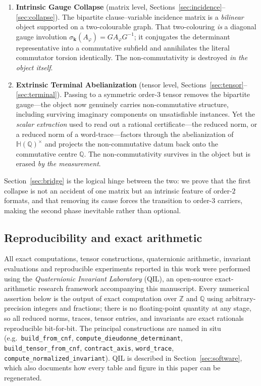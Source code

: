 \documentclass[pdflatex,sn-mathphys-num]{sn-jnl}
\theoremstyle{thmstyleone}%
\theoremstyle{thmstyletwo}%
\theoremstyle{thmstylethree}%
\newcommand{\HH}{\mathbb{H}}
\newcommand{\QQ}{\mathbb{Q}}
\newcommand{\ZZ}{\mathbb{Z}}
\newcommand{\bk}{\mathbf{k}}
\newcommand{\Aphi}{A_{\varphi}}
\begin{document}
\begin{enumerate}
\item \textbf{Intrinsic Gauge Collapse} (matrix level,
Sections~\ref{sec:incidence}--\ref{sec:collapse}). The bipartite
clause--variable incidence matrix is a \emph{bilinear} object supported on
a two-colourable graph. That two-colouring \emph{is} a diagonal gauge
involution $\sigma_{\bk}(\Aphi)=G\Aphi G^{-1}$; it conjugates the
determinant representative into a commutative subfield and annihilates the
literal commutator torsion identically. The non-commutativity is destroyed
\emph{in the object itself}.

\item \textbf{Extrinsic Terminal Abelianization} (tensor level,
Sections~\ref{sec:tensor}--\ref{sec:terminal}). Passing to a symmetric
order-$3$ tensor removes the bipartite gauge---the object now genuinely
carries non-commutative structure, including surviving imaginary
components on unsatisfiable instances. Yet the \emph{scalar extraction}
used to read out a rational certificate---the reduced norm, or a reduced
norm of a word-trace---factors through the abelianization of
$\HH(\QQ)^{\times}$ and projects the non-commutative datum back onto the
commutative centre $\QQ$. The non-commutativity survives in the object but
is erased \emph{by the measurement}.
\end{enumerate}

Section~\ref{sec:bridge} is the logical hinge between the two: we prove that
the first collapse is not an accident of one matrix but an intrinsic
feature of order-$2$ formats, and that removing its cause forces the
transition to order-$3$ carriers, making the second phase inevitable rather
than optional.

\subsection{Reproducibility and exact arithmetic}

All exact computations, tensor constructions, quaternionic arithmetic,
invariant evaluations and reproducible experiments reported in this work
were performed using the \emph{Quaternionic Invariant Laboratory} (QIL), an
open-source exact-arithmetic research framework accompanying this
manuscript. Every numerical assertion below is the output of exact
computation over $\ZZ$ and $\QQ$ using arbitrary-precision integers and
fractions; there is no floating-point quantity at any stage, so all reduced
norms, traces, tensor entries, and invariants are exact rationals
reproducible bit-for-bit. The principal constructions are named in situ
(e.g.\ \texttt{build\_from\_cnf}, \texttt{compute\_dieudonne\_determinant},
\texttt{build\_tensor\_from\_cnf}, \texttt{contract\_axis},
\texttt{word\_trace}, \texttt{compute\_normalized\_invariant}). QIL is
described in Section~\ref{sec:software}, which also documents how every table
and figure in this paper can be regenerated.
\end{document}
